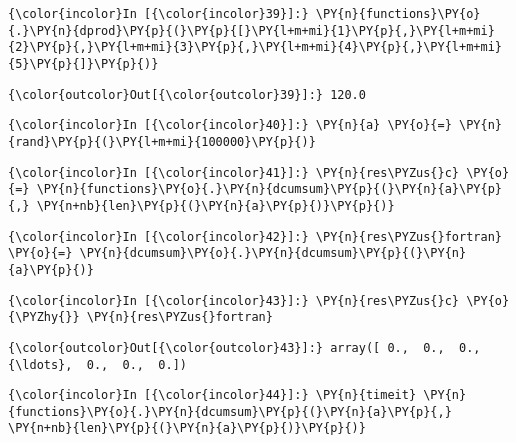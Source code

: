     \begin{Verbatim}[commandchars=\\\{\}]
{\color{incolor}In [{\color{incolor}39}]:} \PY{n}{functions}\PY{o}{.}\PY{n}{dprod}\PY{p}{(}\PY{p}{[}\PY{l+m+mi}{1}\PY{p}{,}\PY{l+m+mi}{2}\PY{p}{,}\PY{l+m+mi}{3}\PY{p}{,}\PY{l+m+mi}{4}\PY{p}{,}\PY{l+m+mi}{5}\PY{p}{]}\PY{p}{)} 
\end{Verbatim}

            \begin{Verbatim}[commandchars=\\\{\}]
{\color{outcolor}Out[{\color{outcolor}39}]:} 120.0
\end{Verbatim}
        


    \begin{Verbatim}[commandchars=\\\{\}]
{\color{incolor}In [{\color{incolor}40}]:} \PY{n}{a} \PY{o}{=} \PY{n}{rand}\PY{p}{(}\PY{l+m+mi}{100000}\PY{p}{)}
\end{Verbatim}

    \begin{Verbatim}[commandchars=\\\{\}]
{\color{incolor}In [{\color{incolor}41}]:} \PY{n}{res\PYZus{}c} \PY{o}{=} \PY{n}{functions}\PY{o}{.}\PY{n}{dcumsum}\PY{p}{(}\PY{n}{a}\PY{p}{,} \PY{n+nb}{len}\PY{p}{(}\PY{n}{a}\PY{p}{)}\PY{p}{)} 
\end{Verbatim}

    \begin{Verbatim}[commandchars=\\\{\}]
{\color{incolor}In [{\color{incolor}42}]:} \PY{n}{res\PYZus{}fortran} \PY{o}{=} \PY{n}{dcumsum}\PY{o}{.}\PY{n}{dcumsum}\PY{p}{(}\PY{n}{a}\PY{p}{)}
\end{Verbatim}

    \begin{Verbatim}[commandchars=\\\{\}]
{\color{incolor}In [{\color{incolor}43}]:} \PY{n}{res\PYZus{}c} \PY{o}{\PYZhy{}} \PY{n}{res\PYZus{}fortran}
\end{Verbatim}

            \begin{Verbatim}[commandchars=\\\{\}]
{\color{outcolor}Out[{\color{outcolor}43}]:} array([ 0.,  0.,  0., {\ldots},  0.,  0.,  0.])
\end{Verbatim}
        


    \begin{Verbatim}[commandchars=\\\{\}]
{\color{incolor}In [{\color{incolor}44}]:} \PY{n}{timeit} \PY{n}{functions}\PY{o}{.}\PY{n}{dcumsum}\PY{p}{(}\PY{n}{a}\PY{p}{,} \PY{n+nb}{len}\PY{p}{(}\PY{n}{a}\PY{p}{)}\PY{p}{)}
\end{Verbatim}


